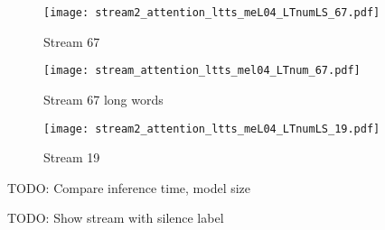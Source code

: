 \begin{figure}[h!]
    \centering
    \texttt{[image: stream2\_attention\_ltts\_meL04\_LTnumLS\_67.pdf]}
    \caption{Stream 67}%
    \label{fig:stream_attention_ltts_meL04_LTnumLS_67}
\end{figure}

\begin{figure}[h!]
    \centering
    \texttt{[image: stream\_attention\_ltts\_mel04\_LTnum\_67.pdf]}
    \caption{Stream 67 long words}%
    \label{fig:stream_attention_ltts_mel04_LTnum_67}
\end{figure}

\begin{figure}[h!]
    \centering
    \texttt{[image: stream2\_attention\_ltts\_meL04\_LTnumLS\_19.pdf]}
    \caption{Stream 19}%
    \label{fig:stream_attention_ltts_meL04_LTnumLS_19}
\end{figure}


TODO: Compare inference time, model size

TODO: Show stream with silence label

